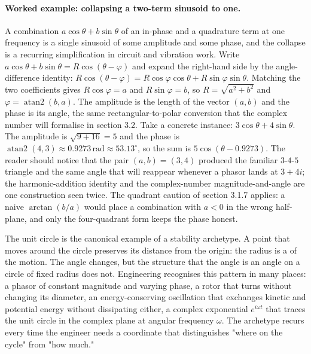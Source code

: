 \paragraph{Worked example: collapsing a two-term sinusoid to one.} A
combination $a\cos\theta + b\sin\theta$ of an in-phase and a
quadrature term at one frequency is a single sinusoid of some
amplitude and some phase, and the collapse is a recurring
simplification in circuit and vibration work. Write $a\cos\theta +
b\sin\theta = R\cos(\theta - \varphi)$ and expand the right-hand side
by the angle-difference identity: $R\cos(\theta - \varphi) = R\cos
\varphi\cos\theta + R\sin\varphi\sin\theta$. Matching the two
coefficients gives $R\cos\varphi = a$ and $R\sin\varphi = b$, so
$R = \sqrt{a^{2} + b^{2}}$ and $\varphi = \operatorname{atan2}(b, a)$.
The amplitude is the length of the vector $(a, b)$ and the phase is
its angle, the same rectangular-to-polar conversion that the complex
number will formalise in section 3.2. Take a concrete instance:
$3\cos\theta + 4\sin\theta$. The amplitude is $\sqrt{9 + 16} = 5$ and
the phase is $\operatorname{atan2}(4, 3) \approx 0.9273\,\text{rad}
\approx 53.13^{\circ}$, so the sum is $5\cos(\theta - 0.9273)$. The
reader should notice that the pair $(a, b) = (3, 4)$ produced the
familiar $3$-$4$-$5$ triangle and the same angle that will reappear
whenever a phasor lands at $3 + 4i$; the harmonic-addition identity
and the complex-number magnitude-and-angle are one construction seen
twice. The quadrant caution of section 3.1.7 applies: a naive
$\arctan(b/a)$ would place a combination with $a < 0$ in the wrong
half-plane, and only the four-quadrant form keeps the phase honest.

\begin{archetype}
The unit circle is the canonical example of a stability archetype.
A point that moves around the circle preserves its distance from
the origin: the radius is a  of the
motion. The angle changes, but the structure that the angle is an
angle on a circle of fixed radius does not. Engineering recognises
this pattern in many places: a phasor of constant magnitude and
varying phase, a rotor that turns without changing its diameter, an
energy-conserving oscillation that exchanges kinetic and potential
energy without dissipating either, a complex exponential
$e^{i\omega t}$ that traces the unit circle in the complex plane at
angular frequency $\omega$. The archetype recurs every time the
engineer needs a coordinate that distinguishes "where on the
cycle" from "how much."
\end{archetype}

